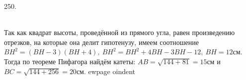 250. \begin{figure}[ht!]
\end{figure}\\
Так как квадрат высоты, проведённой из прямого угла, равен произведению отрезков, на которые она делит гипотенузу, имеем соотношение $BH^2=(BH-3)(BH+4),\ BH^2=BH^2+4BH-3BH-12,\ BH=12$см. Тогда по теореме Пифагора найдём катеты:
$AB=\sqrt{144+81}=15$см и $BC=\sqrt{144+256}=20$см.
ewpage
oindent
